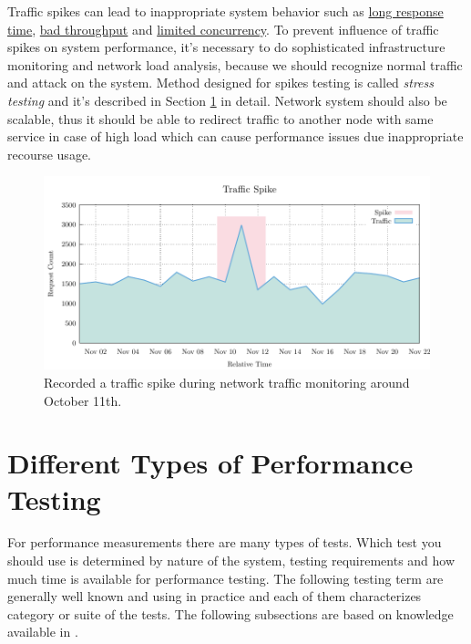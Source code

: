Traffic spikes can lead to inappropriate system behavior such as \underline{long response time}, \underline{bad throughput} and \underline{limited concurrency}. To prevent influence of traffic spikes on system performance, it's  necessary to do sophisticated infrastructure monitoring and network load analysis, because we should recognize normal traffic and attack on the system. Method designed for spikes testing is called \emph{stress testing} \cite{Manzor:APTB} and it's described in Section \ref{Different Types of Performance Testing} in detail. Network system should also be scalable, thus it should be able to redirect traffic to another node with same service in case of high load which can cause performance issues due inappropriate recourse usage.

\begin{figure}[H]
  \centering
  \includegraphics[width=14cm]{obrazky-figures/traffic_spike.pdf}
  \caption{Recorded a traffic spike during network traffic monitoring around October 11th.}
  \label{fig:spikes}
\end{figure}

\section{Different Types of Performance Testing}
\label{Different Types of Performance Testing}

For performance measurements there are many types of tests. Which test you should use is determined by nature of the system, testing requirements and how much time is available for performance testing. The following testing term are generally well known and using in practice and each of them characterizes category or suite of the tests. The following subsections are based on knowledge available in \cite{TuPo:TESTS, BUCH:4TYPES, Molyneaux:TAoAPT}.

